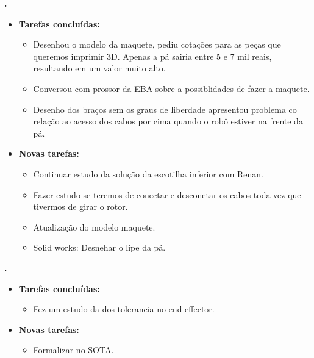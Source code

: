    \textbf{.} 
	\begin{itemize}
		\item \textbf{Tarefas concluídas:}
			\begin{itemize}    
				\item Desenhou o modelo da maquete, pediu cotações para as peças que
				queremos imprimir 3D. Apenas a pá sairia entre 5 e 7 mil reais, resultando
				em um valor muito alto. 
				\item Conversou com prossor da EBA sobre a possiblidades de fazer a maquete.
				\item Desenho dos braços sem os graus de liberdade apresentou problema co
				relação ao acesso dos cabos por cima quando o robô estiver na frente da pá.
				
			\end{itemize}
		
		\item \textbf{Novas tarefas:}
			\begin{itemize} 
			    \item Continuar estudo da solução da escotilha inferior com Renan.
			    \item Fazer estudo se teremos de conectar e desconetar os cabos toda vez
			    que tivermos de girar o rotor.
				\item Atualização do modelo maquete.
			    \item Solid works: Desnehar o lipe da pá.
			\end{itemize}
	\end{itemize}

	  \textbf{\Renan.} 
	\begin{itemize}
		\item \textbf{Tarefas concluídas:}
			\begin{itemize}    
				\item Fez um estudo da dos tolerancia no end effector. 
			\end{itemize}
		
		\item \textbf{Novas tarefas:}
			\begin{itemize} 
			    \item Formalizar no SOTA. 
			\end{itemize}
	\end{itemize}		
			
